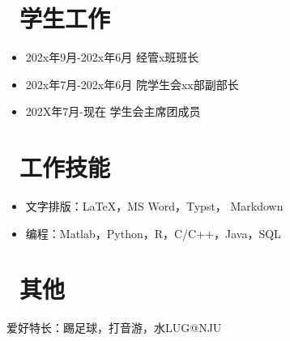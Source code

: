 \documentclass[11pt]{article}
\begin{document}
%
%

\section{\makebox[\widthof{\faGraduationCap}][c]{\color{njuviolet}\faUsers}\ 学生工作}
\begin{itemize}
	\item 202x年9月-202x年6月 \quad 经管x班班长
	\item 202x年7月-202x年6月 \quad 院学生会xx部副部长
	\item 202X年7月-现在 \quad 学生会主席团成员
\end{itemize}

\section{\makebox[\widthof{\faGraduationCap}][c]{\color{njuviolet}\faWrench}\ 工作技能}

\begin{itemize}
	\item 文字排版：\LaTeX{}，MS Word，Typst， Markdown
	\item 编程：Matlab，Python，R，C/C++，Java，SQL

\end{itemize}

\section{\makebox[\widthof{\faGraduationCap}][c]{\color{njuviolet}\faTags}\ 其他}
爱好特长：踢足球，打音游，水LUG@NJU

\end{document}

